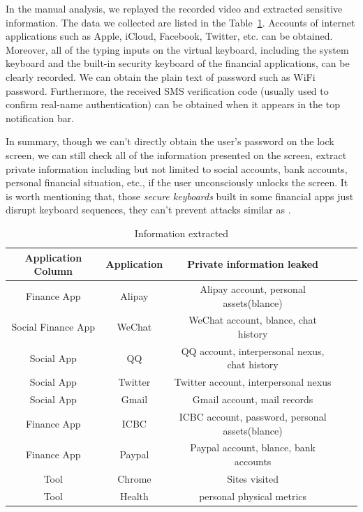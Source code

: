In the manual analysis, we replayed the recorded video and extracted sensitive information.
The data we collected are listed in the Table~\ref{table:information_extracted}. 
Accounts of internet applications such as Apple, iCloud, Facebook, Twitter, etc. can be obtained. 
Moreover, all of the typing inputs on the virtual keyboard, including the system keyboard and the built-in security keyboard of the financial applications, can be clearly recorded.
We can obtain the plain text of password such as WiFi password.
Furthermore, the received SMS verification code (usually used to confirm real-name authentication) can be obtained when it appears in the top notification bar. 

In summary, though we can't directly obtain the user's password on the lock screen, we can still check all of the information presented on the screen, extract private information including but not limited to social accounts, bank accounts, personal financial situation, etc., if the user unconsciously unlocks the screen.
It is worth mentioning that, those \textit{secure keyboards} built in some financial apps just disrupt keyboard sequences, they can't prevent attacks similar as \tool.

\begin{table}[t]
	\centering
	\begin{tabular}{|c|c|c|c|c|}
		\hline
		Application Column  & Application & Private information leaked                       \\
		\hline
		Finance App         & Alipay      & Alipay account, personal assets(blance)          \\
		\hline
		Social  Finance App & WeChat      & WeChat account, blance, chat history             \\
		\hline
		Social App          & QQ          & QQ account, interpersonal nexus, chat history    \\
		\hline
		Social App          & Twitter     & Twitter account, interpersonal nexus             \\
		\hline
		Social App          & Gmail       & Gmail account, mail records                      \\
		\hline
		Finance App         & ICBC        & ICBC account, password, personal assets(blance)  \\
		\hline
		Finance App         & Paypal      & Paypal account, blance, bank accounts            \\
		\hline
		Tool                & Chrome      & Sites visited                                    \\
		\hline
		Tool                & Health      & personal physical metrics      					 \\
		\hline
	\end{tabular}
	\linebreak
	\caption{Information extracted}
	\label{table:information_extracted}
\end{table}